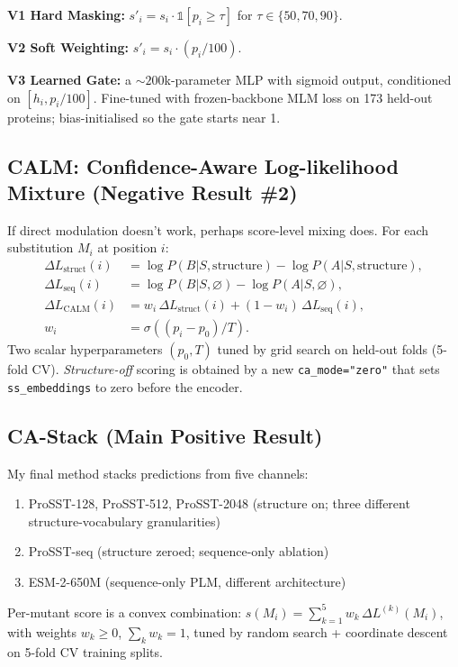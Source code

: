 \documentclass[11pt,a4paper]{article}
\begin{document}
\textbf{V1 Hard Masking:} $s'_i = s_i \cdot \mathbb{1}[p_i \geq \tau]$ for
$\tau \in \{50, 70, 90\}$.

\textbf{V2 Soft Weighting:} $s'_i = s_i \cdot (p_i / 100)$.

\textbf{V3 Learned Gate:} a $\sim\!200$k-parameter MLP with sigmoid
output, conditioned on $[h_i, p_i/100]$. Fine-tuned with frozen-backbone
MLM loss on 173 held-out proteins; bias-initialised so the gate starts
near 1.

\subsection{CALM: Confidence-Aware Log-likelihood Mixture (Negative Result \#2)}
If direct modulation doesn't work, perhaps score-level mixing does.
For each substitution $M_i$ at position $i$:
\begin{align}
\Delta L_\text{struct}(i) &= \log P(B | S, \text{structure}) - \log P(A | S, \text{structure}), \\
\Delta L_\text{seq}(i) &= \log P(B | S, \varnothing) - \log P(A | S, \varnothing), \\
\Delta L_\text{CALM}(i) &= w_i \, \Delta L_\text{struct}(i) + (1 - w_i) \, \Delta L_\text{seq}(i), \\
w_i &= \sigma\!\left((p_i - p_0) / T\right).
\end{align}
Two scalar hyperparameters $(p_0, T)$ tuned by grid search on held-out
folds (5-fold CV). \emph{Structure-off} scoring is obtained by a new
\texttt{ca\_mode="zero"} that sets \texttt{ss\_embeddings} to zero
before the encoder.

\subsection{CA-Stack (Main Positive Result)}
My final method stacks predictions from five channels:
\begin{enumerate}[leftmargin=*,itemsep=0pt]
    \item ProSST-128, ProSST-512, ProSST-2048 (structure on; three
    different structure-vocabulary granularities)
    \item ProSST-seq (structure zeroed; sequence-only ablation)
    \item ESM-2-650M (sequence-only PLM, different architecture)
\end{enumerate}
Per-mutant score is a convex combination:
$s(M_i) = \sum_{k=1}^{5} w_k \, \Delta L^{(k)}(M_i)$,
with weights $w_k \geq 0$, $\sum_k w_k = 1$, tuned by random search +
coordinate descent on 5-fold CV training splits.
\end{document}
